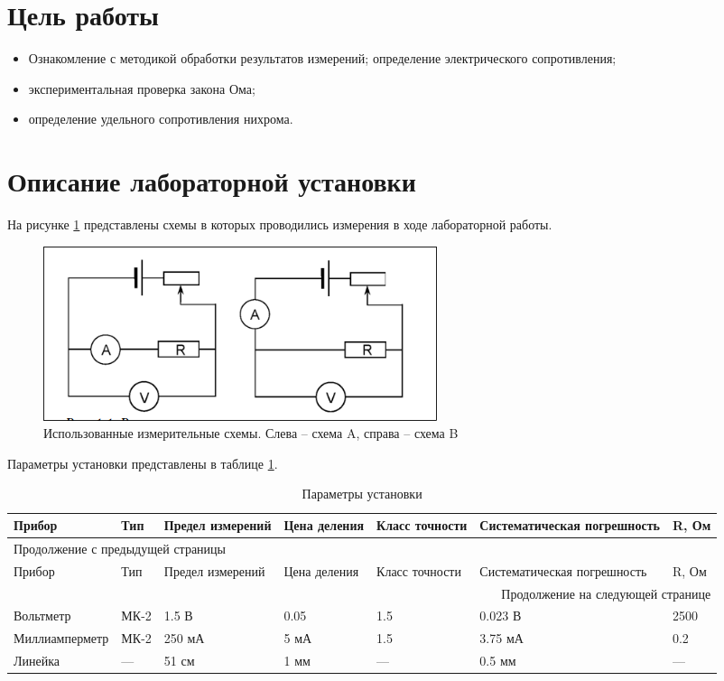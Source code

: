 \documentclass[14pt]{extarticle}
\begin{document}
\section{Цель работы}
\label{sec:org7160f5d}

\begin{itemize}
\item Ознакомление с методикой обработки результатов измерений;
определение электрического сопротивления;
\item экспериментальная проверка закона Ома;
\item определение удельного сопротивления нихрома.
\end{itemize}
\section{Описание лабораторной установки}
\label{sec:orgbd262b7}

На рисунке \ref{fig:orge3e807f} представлены схемы в которых проводились измерения в ходе
лабораторной работы.

\begin{figure}[H]
\centering
\includegraphics[width=.9\linewidth]{./images/twoSchemes.png}
\caption{\label{fig:orge3e807f}Использованные измерительные схемы. Слева – схема A, справа – схема B}
\end{figure}

Параметры установки представлены в таблице \ref{tab:org8153a32}.

\begin{longtable}{|p{3.9cm}|l|p{2cm}|p{1.3cm}|p{1.2cm}|p{3.6cm}|p{1.2cm}|}
\caption{\label{tab:org8153a32}Параметры установки}
\\
\hline
Прибор & Тип & Предел измерений & Цена деления & Класс точности & Систематическая погрешность & R, Ом\\
\hline
\endfirsthead
\multicolumn{7}{l}{Продолжение с предыдущей страницы} \\
\hline

Прибор & Тип & Предел измерений & Цена деления & Класс точности & Систематическая погрешность & R, Ом \\

\hline
\endhead
\hline\multicolumn{7}{r}{Продолжение на следующей странице} \\
\endfoot
\endlastfoot
\hline
Вольтметр & МК-2 & 1.5 В & 0.05 & 1.5 & 0.023 В & 2500\\
\hline
Миллиамперметр & МК-2 & 250 мА & 5 мА & 1.5 & 3.75 мА & 0.2\\
\hline
Линейка & --- & 51 см & 1 мм & --- & 0.5 мм & ---\\
\hline
\end{longtable}
\end{document}
